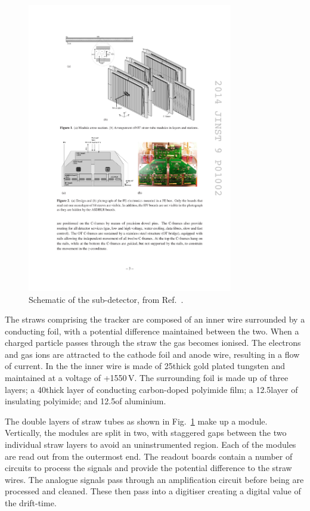 \begin{figure}[!h]
    \centering
    \includegraphics[width=0.8\textwidth]{figs/Detector/ot_layout.pdf}
    \caption{Schematic of the \ot sub-detector, from Ref.~\cite{LHCb-DP-2013-003}.}
    \label{fig:Dec_ot_schematic}   
\end{figure}
 
The straws comprising the tracker are composed of an inner wire surrounded by a conducting foil, with a potential difference maintained between the two. When a charged particle passes through the straw the gas becomes ionised. The electrons and gas ions are attracted to the cathode foil and anode wire, resulting in a flow of current. In the \ot the inner wire is made of 25\mum thick gold plated tungsten and maintained at a voltage of +1550\,V. The surrounding foil is made up of three layers; a 40\mum thick layer of conducting carbon-doped polyimide film; a 12.5\mum layer of insulating polyimide; and 12.5\mum of aluminium. 

The double layers of straw tubes as shown in Fig.~\ref{fig:Dec_ot_schematic} make up a module. Vertically, the modules are split in two, with staggered gaps between the two individual straw layers to avoid an uninstrumented region. Each of the modules are read out from the outermost end. 
The readout boards contain a number of circuits to process the signals and provide the potential difference to the straw wires.
The analogue signals pass through an amplification circuit before being are processed and cleaned. These then pass into a digitiser creating a digital value of the drift-time.   


